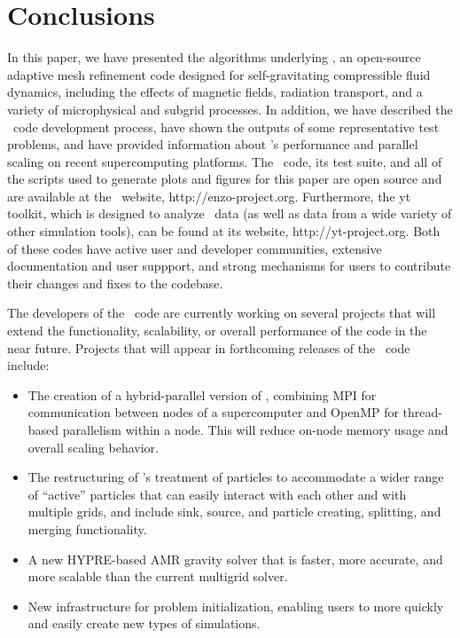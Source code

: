 
\section{Conclusions}
\label{sec.conclusions}

In this paper, we have presented the algorithms underlying \enzo, an
open-source adaptive mesh refinement code designed for
self-gravitating compressible fluid dynamics, including the effects of
magnetic fields, radiation transport, and a variety of microphysical
and subgrid processes.  In addition, we have described the \enzo\ code
development process, have shown the outputs of some representative
test problems, and have provided information about \enzo's performance
and parallel scaling on recent supercomputing platforms.  The \enzo\
code, its test suite, and all of the scripts used to generate plots
and figures for this paper are open source and are available at the
\enzo\ website, http://enzo-project.org.  Furthermore, the yt toolkit,
which is designed to analyze \enzo\ data (as well as data from a wide
variety of other simulation tools), can be found at its website,
http://yt-project.org.  Both of these codes have active user and
developer communities, extensive documentation and user suppport, and
strong mechanisms for users to contribute their changes and fixes to
the codebase.

The developers of the \enzo\ code are currently working on several
projects that will extend the functionality, scalability, or overall
performance of the code in the near future.  Projects that will appear
in forthcoming releases of the \enzo\ code include:

\begin{itemize}
\item The creation of a hybrid-parallel version of \enzo, combining
MPI for communication between nodes of a supercomputer and OpenMP for
thread-based parallelism within a node.  This will reduce on-node
memory usage and overall scaling behavior.
\item The restructuring of \enzo's treatment of particles to
accommodate a wider range of ``active'' particles that can easily
interact with each other and with multiple grids, and include sink,
source, and particle creating, splitting, and merging functionality.
\item A new HYPRE-based AMR gravity solver that is faster, more
accurate, and more scalable than the current multigrid solver.
\item New infrastructure for problem initialization, enabling
  users to more quickly and easily create new types of simulations.
\end{itemize}


